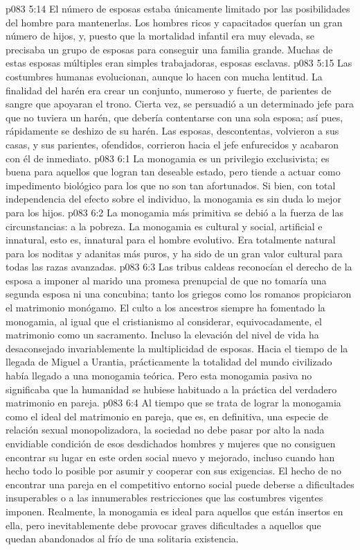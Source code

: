 \vs p083 5:14 El número de esposas estaba únicamente limitado por las posibilidades del hombre para mantenerlas. Los hombres ricos y capacitados querían un gran número de hijos, y, puesto que la mortalidad infantil era muy elevada, se precisaba un grupo de esposas para conseguir una familia grande. Muchas de estas esposas múltiples eran simples trabajadoras, esposas esclavas.
\vs p083 5:15 Las costumbres humanas evolucionan, aunque lo hacen con mucha lentitud. La finalidad del harén era crear un conjunto, numeroso y fuerte, de parientes de sangre que apoyaran el trono. Cierta vez, se persuadió a un determinado jefe para que no tuviera un harén, que debería contentarse con una sola esposa; así pues, rápidamente se deshizo de su harén. Las esposas, descontentas, volvieron a sus casas, y sus parientes, ofendidos, corrieron hacia el jefe enfurecidos y acabaron con él de inmediato.
\vs p083 6:1 La monogamia es un privilegio exclusivista; es buena para aquellos que logran tan deseable estado, pero tiende a actuar como impedimento biológico para los que no son tan afortunados. Si bien, con total independencia del efecto sobre el individuo, la monogamia es sin duda lo mejor para los hijos.
\vs p083 6:2 La monogamia más primitiva se debió a la fuerza de las circunstancias: a la pobreza. La monogamia es cultural y social, artificial e innatural, esto es, innatural para el hombre evolutivo. Era totalmente natural para los noditas y adanitas más puros, y ha sido de un gran valor cultural para todas las razas avanzadas.
\vs p083 6:3 Las tribus caldeas reconocían el derecho de la esposa a imponer al marido una promesa prenupcial de que no tomaría una segunda esposa ni una concubina; tanto los griegos como los romanos propiciaron el matrimonio monógamo. El culto a los ancestros siempre ha fomentado la monogamia, al igual que el cristianismo al considerar, equivocadamente, el matrimonio como un sacramento. Incluso la elevación del nivel de vida ha desaconsejado invariablemente la multiplicidad de esposas. Hacia el tiempo de la llegada de Miguel a Urantia, prácticamente la totalidad del mundo civilizado había llegado a una monogamia teórica. Pero esta monogamia pasiva no significaba que la humanidad se hubiese habituado a la práctica del verdadero matrimonio en pareja.
\vs p083 6:4 \pc Al tiempo que se trata de lograr la monogamia como el ideal del matrimonio en pareja, que es, en definitiva, una especie de relación sexual monopolizadora, la sociedad no debe pasar por alto la nada envidiable condición de esos desdichados hombres y mujeres que no consiguen encontrar su lugar en este orden social nuevo y mejorado, incluso cuando han hecho todo lo posible por asumir y cooperar con sus exigencias. El hecho de no encontrar una pareja en el competitivo entorno social puede deberse a dificultades insuperables o a las innumerables restricciones que las costumbres vigentes imponen. Realmente, la monogamia es ideal para aquellos que están insertos en ella, pero inevitablemente debe provocar graves dificultades a aquellos que quedan abandonados al frío de una solitaria existencia.
